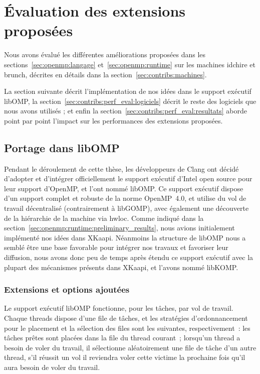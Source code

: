\section{Évaluation des extensions proposées}\label{sec:contribs:perf_eval}


Nous avons évalué les différentes améliorations proposées dans les sections~\ref{sec:openmp:langage} et~\ref{sec:openmp:runtime} sur les machines idchire et brunch, décrites en détails dans la section~\ref{sec:contribs:machines}.

La section suivante décrit l'implémentation de nos idées dans le support exécutif libOMP, la section~\ref{sec:contribs:perf_eval:logiciels} décrit le reste des logiciels que nous avons utilisés ; et enfin la section~\ref{sec:contribs:perf_eval:resultats} aborde point par point l'impact sur les performances des extensions proposées.

\subsection{Portage dans libOMP}\label{sec:contribs:perf_eval:libkomp}

Pendant le déroulement de cette thèse, les développeurs de Clang ont décidé d'adopter et d'intégrer officiellement le support exécutif d'Intel open source pour leur support d'OpenMP, et l'ont nommé libOMP.
Ce support exécutif dispose d'un support complet et robuste de la norme OpenMP~4.0, et utilise du vol de travail décentralisé (contrairement à libGOMP), avec également une découverte de la hiérarchie de la machine via hwloc.
Comme indiqué dans la section~\ref{sec:openmp:runtime:preliminary_results}, nous avions initialement implémenté nos idées dans XKaapi.
Néanmoins la structure de libOMP nous a semblé être une base favorable pour intégrer nos travaux et favoriser leur diffusion, nous avons donc peu de temps après étendu ce support exécutif avec la plupart des mécanismes présents dans XKaapi, et l'avons nommé libKOMP.

\subsubsection{Extensions et options ajoutées}
\label{sec:contribs:perf_eval:portage_libkomp}

Le support exécutif libOMP fonctionne, pour les tâches, par vol de travail.
Chaque threads dispose d'une file de tâches, et les stratégies d'ordonnancement pour le placement et la sélection des files sont les suivantes, respectivement~: les tâches prêtes sont placées dans la file du thread courant~; lorsqu'un thread a besoin de voler du travail, il sélectionne aléatoirement une file de tâche d'un autre thread, s'il réussit un vol il reviendra voler cette victime la prochaine fois qu'il aura besoin de voler du travail.

